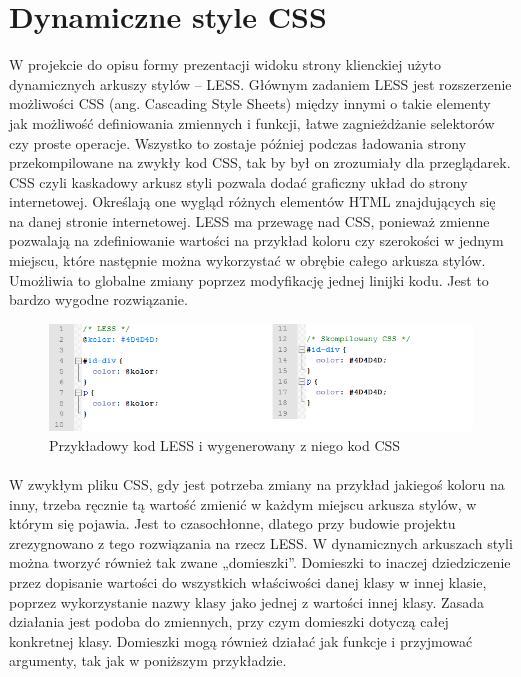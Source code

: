 \section{Dynamiczne style CSS}
W projekcie do opisu formy prezentacji widoku strony klienckiej użyto dynamicznych arkuszy stylów – LESS. Głównym zadaniem LESS jest rozszerzenie możliwości CSS (ang. Cascading Style Sheets) między innymi o takie elementy jak możliwość definiowania zmiennych i funkcji, łatwe zagnieżdżanie selektorów czy proste operacje. Wszystko to zostaje później podczas ładowania strony przekompilowane na zwykły kod CSS, tak by był on zrozumiały dla przeglądarek. CSS czyli kaskadowy arkusz styli pozwala dodać graficzny układ do strony internetowej. Określają one wygląd różnych elementów HTML znajdujących się na danej stronie internetowej. 
LESS ma przewagę nad CSS, ponieważ zmienne pozwalają na zdefiniowanie wartości na przykład koloru czy szerokości w jednym miejscu, które następnie można wykorzystać w obrębie całego arkusza stylów. Umożliwia to globalne zmiany poprzez modyfikację jednej linijki kodu. Jest to bardzo wygodne rozwiązanie. 

\begin{figure}[h]
	\centering
	\includegraphics[width=1.00\textwidth]{images/less1.png}
	\caption{Przykładowy kod LESS i wygenerowany z niego kod CSS}
\end{figure}
\paragraph{}
W zwykłym pliku CSS, gdy jest potrzeba zmiany na przykład jakiegoś koloru na inny, trzeba ręcznie tą wartość zmienić w każdym miejscu arkusza stylów, w którym się pojawia. Jest to czasochłonne, dlatego przy budowie projektu zrezygnowano z tego rozwiązania na rzecz LESS. 
W dynamicznych arkuszach styli można tworzyć również tak zwane „domieszki”. Domieszki to inaczej dziedziczenie przez dopisanie wartości do wszystkich właściwości danej klasy w innej klasie, poprzez wykorzystanie nazwy klasy jako jednej z wartości innej klasy. Zasada działania jest podoba do zmiennych, przy czym domieszki dotyczą całej konkretnej klasy. Domieszki mogą również działać jak funkcje i przyjmować argumenty, tak jak w poniższym przykładzie.

